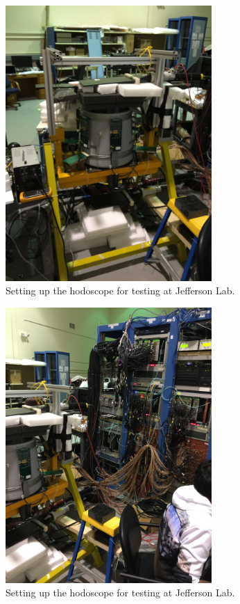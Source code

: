 \begin{figure}
	\centering
	\includegraphics[width=0.7\textwidth]{ImgChap1/JLABTestingHodo}
	\caption{Setting up the hodoscope for testing at Jefferson Lab.}		
	\label{JLABHodo}
\end{figure}

\begin{figure}
	\centering
	\includegraphics[width=0.7\textwidth]{ImgChap1/JLABTestingElectronics}
	\caption{Setting up the hodoscope for testing at Jefferson Lab.}		
	\label{JLABElec}
\end{figure}


